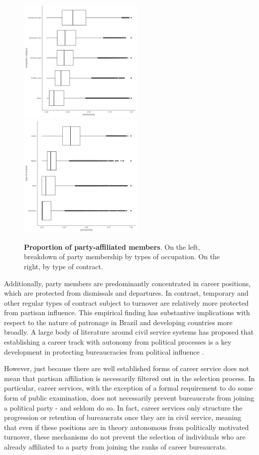 \begin{figure}[H]
    \centering
    \includegraphics[width = 6cm, height = 6cm]{chapters/chapter_3/figures/partisanship/plot_partisanship_by_cbo_group.pdf}
    \includegraphics[width = 6cm, height = 6cm]{chapters/chapter_3/figures/partisanship/plot_partisanship_by_contract_type.pdf}
    \caption{\textbf{Proportion of party-affiliated members}. On the left, breakdown of party membership by types of occupation. On the right, by type of contract.}
    \label{fig:partisan_breakdown}
\end{figure}

Additionally, party members are predominantly concentrated in career positions, which are protected from dismissals and departures. In contrast, temporary and other regular types of contract subject to turnover are relatively more protected from partisan influence. This empirical finding has substantive implications with respect to the nature of patronage in Brazil and developing countries more broadly. A large body of literature around civil service systems has proposed that establishing a career track with autonomy from political processes is a key development in protecting bureaucracies from political influence \citep{grindle2012jobs,carpenter2020forging}.

However, just because there are well established forms of career service does not mean that partisan affiliation is necessarily filtered out in the selection process. In particular, career services, with the exception of a formal requirement to do some form of public examination, does not necessarily prevent bureaucrats from joining a political party - and seldom do so. In fact, career services only structure the progression or retention of bureaucrats once they are in civil service, meaning that even if these positions are in theory autonomous from politically motivated turnover, these mechanisms do not prevent the selection of individuals who are already affiliated to a party from joining the ranks of career bureaucrats. 

